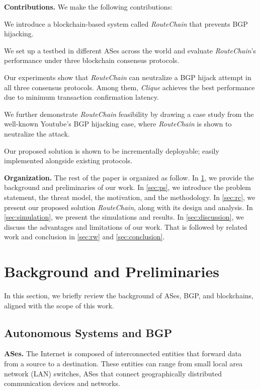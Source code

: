 \documentclass[5p]{elsarticle}
\newcommand{\BfPara}[1]{{\noindent\bf#1.}\xspace}
\newcommand{\rc}{{{\em RouteChain}}\xspace}
\begin{document}
\BfPara{Contributions} We make the following contributions:
\begin{enumerate*}
    \item We introduce a blockchain-based system called \rc that prevents BGP hijacking.
    \item We set up a testbed in different ASes across the world and evaluate \rc's performance under three blockchain consensus protocols. 
    \item Our experiments show that \rc can neutralize a BGP hijack attempt in all three consensus protocols. Among them, {\em Clique} achieves the best performance due to minimum transaction confirmation latency. 
    \item We further demonstrate \rc feasibility by drawing a case study from the well-known Youtube's BGP hijacking case, where \rc is shown to neutralize the attack.  
    \item Our proposed solution is shown to be incrementally deployable; easily implemented alongside existing protocols. 
\end{enumerate*}

\BfPara{Organization} The rest of the paper is organized as follow. In \textsection\ref{sec:bg}, we provide the background and preliminaries of our work. In \textsection\ref{sec:ps}, we introduce the problem statement, the threat model, the motivation, and the methodology. In \textsection\ref{sec:rc}, we present our proposed solution \rc, along with its design and analysis. In \textsection\ref{sec:simulation}, we present the simulations and results. In \textsection\ref{sec:discussion}, we discuss the advantages and limitations of our work. That is followed by related work and conclusion in \textsection\ref{sec:rw} and \textsection\ref{sec:conclusion}.  




\section{Background and Preliminaries}\label{sec:bg}
In this section, we briefly review the background of ASes, BGP, and blockchains, aligned with the scope of this work. 

\subsection{Autonomous Systems and BGP} \label{sec:AS}
\BfPara{ASes} The Internet is composed of interconnected entities that forward data from a source to a destination. These entities can range from small local area network (LAN) switches, ASes that connect geographically distributed communication devices and networks. 
\end{document}
